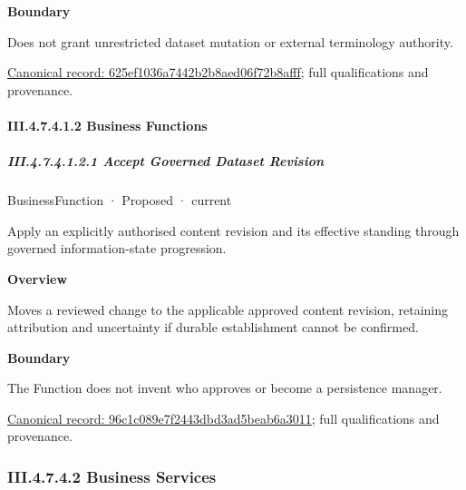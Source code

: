 \textbf{Boundary}



Does not grant unrestricted dataset mutation or external terminology authority.


{\footnotesize \href{../../../../../../../continuum/business/business-service/625ef1036a7442b2b8aed06f72b8afff.md}{Canonical record: 625ef1036a7442b2b8aed06f72b8afff}; full qualifications and provenance.}\par
\paragraph*{III.4.7.4.1.2 Business Functions}
\label{navigation:III.4.7.4.1.2}

\subparagraph*{III.4.7.4.1.2.1 Accept Governed Dataset Revision}
\label{navigation:III.4.7.4.1.2.1}

\label{element:96c1c089e7f2443dbd3ad5beab6a3011}
{\small BusinessFunction · Proposed · current}\par

Apply an explicitly authorised content revision and its effective standing through governed information-state progression.



\textbf{Overview}



Moves a reviewed change to the applicable approved content revision, retaining attribution and uncertainty if durable establishment cannot be confirmed.



\textbf{Boundary}



The Function does not invent who approves or become a persistence manager.


{\footnotesize \href{../../../../../../../continuum/business/business-function/96c1c089e7f2443dbd3ad5beab6a3011.md}{Canonical record: 96c1c089e7f2443dbd3ad5beab6a3011}; full qualifications and provenance.}\par
\subsubsection*{III.4.7.4.2 Business Services}
\label{navigation:III.4.7.4.2}

